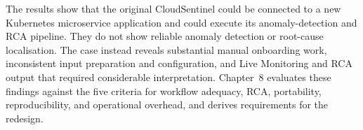 The results show that the original CloudSentinel could be connected to a new Kubernetes microservice application and could execute its anomaly-detection and RCA pipeline. They do not show reliable anomaly detection or root-cause localisation. The case instead reveals substantial manual onboarding work, inconsistent input preparation and configuration, and Live Monitoring and RCA output that required considerable interpretation. Chapter~8 evaluates these findings against the five criteria for workflow adequacy, RCA, portability, reproducibility, and operational overhead, and derives requirements for the redesign.
